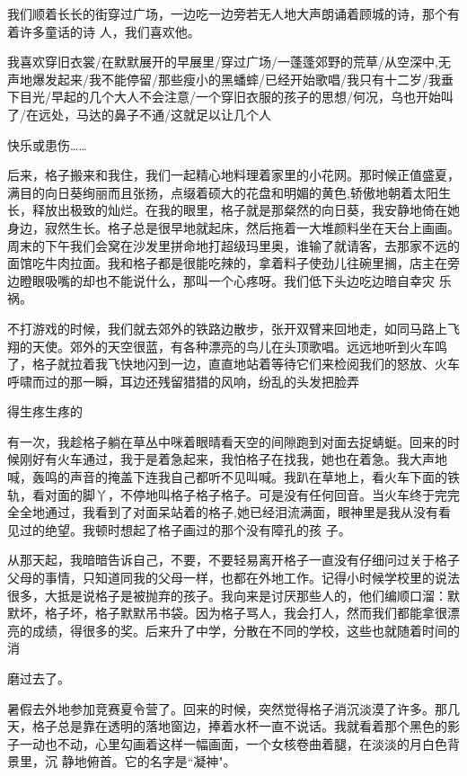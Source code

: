 \documentclass{article}
\begin{document}
我们顺着长长的街穿过广场，一边吃一边旁若无人地大声朗诵着顾城的诗，那个有着许多童话的诗
人，我们喜欢他。 

我喜欢穿旧衣裳/在默默展开的早展里/穿过广场/一蓬蓬郊野的荒草/从空深中,无声地爆发起来/我不能停留/那些瘦小的黑蟠蟀/已经开始歌唱/我只有十二岁/我垂下目光/早起的几个大人不会注意/一个穿旧衣服的孩子的思想/何况，乌也开始叫了/在远处，马达的鼻子不通/这就足以让几个人

\newpage
快乐或患伤…… 

后来，格子搬来和我住，我们一起精心地料理着家里的小花网。那时候正值盛夏，满目的向日葵绚丽而且张扬，点缀着硕大的花盘和明媚的黄色,轿傲地朝着太阳生长，释放出极致的灿烂。在我的眼里，格子就是那粲然的向日葵，我安静地倚在她身边，寂然生长。格子总是很早地就起床，然后拖着一大堆颜料坐在天台上画画。周末的下午我们会窝在沙发里拼命地打超级玛里奥，谁输了就请客，去那家不远的面馆吃牛肉拉面。我和格子都是很能吃辣的，拿着料子使劲儿往碗里搁，店主在旁边瞪眼吸嘴的却也不能说什么，那叫一个心疼呀。我们低下头边吃边暗自幸灾
乐祸。 

不打游戏的时候，我们就去郊外的铁路边散步，张开双臂来回地走，如同马路上飞翔的天使。郊外的天空很蓝，有各种漂亮的鸟儿在头顶歌唱。远远地听到火车鸣了，格子就拉着我飞快地闪到一边，直直地站着等待它们来检阅我们的怒放、火车呼啸而过的那一瞬，耳边还残留猎猎的风响，纷乱的头发把脸弄

\newpage
得生疼生疼的 

有一次，我趁格子躺在草丛中咪着眼晴看天空的间隙跑到对面去捉蜻蜓。回来的时候刚好有火车通过，我于是着急起来，我怕格子在找我，她也在着急。我大声地喊，轰鸣的声音的掩盖下连我自己都听不见叫喊。我趴在草地上，看火车下面的铁轨，看对面的脚丫，不停地叫格子格子格子。可是没有任何回音。当火车终于完完全全地通过，我看到了对面呆站着的格子,她已经泪流满面，眼神里是我从没有看见过的绝望。我顿时想起了格子画过的那个没有障孔的孩
子。 

从那天起，我暗暗告诉自己，不要，不要轻易离开格子一直没有仔细问过关于格子父母的事情，只知道同我的父母一样，也都在外地工作。记得小时候学校里的说法很多，大抵是说格子是被抛弃的孩子。我向来是讨厌那些人的，他们编顺口溜：默默坏，格子坏，格子默默吊书袋。因为格子骂人，我会打人，然而我们都能拿很漂亮的成绩，得很多的奖。后来升了中学，分散在不同的学校，这些也就随着时间的消

\newpage
磨过去了。 

暑假去外地参加竞赛夏令营了。回来的时候，突然觉得格子消沉淡漠了许多。那几天，格子总是靠在透明的落地窗边，捧着水杯一直不说话。我就看着那个黑色的影子一动也不动，心里勾画着这样一幅画面，一个女核卷曲着腿，在淡淡的月白色背景里，沉
静地俯首。它的名字是“凝神"。 
\end{document}
